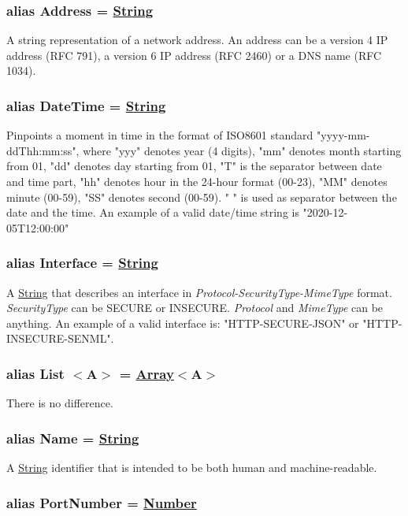 \documentclass[a4paper]{arrowhead}
\newcommand{\pdef}[1]{{\textcolor{ArrowheadGrey}{#1 \label{sec:model:primitives:#1} \label{sec:model:primitives:#1s}}}}
\newcommand{\pref}[1]{{\textcolor{ArrowheadGrey}{\hyperref[sec:model:primitives:#1]{#1}}}}
\begin{document}
\subsubsection{alias \pdef{Address} = \pref{String}}

A string representation of a network address. An address can be a version 4 IP address (RFC 791), a version 6 IP address (RFC 2460) or a DNS name (RFC 1034).

\subsubsection{alias \pdef{DateTime} = \pref{String}}

Pinpoints a moment in time in the format of ISO8601 standard "yyyy-mm-ddThh:mm:ss", where "yyy" denotes year (4 digits), "mm" denotes month starting from 01, "dd" denotes day starting from 01, "T" is the separator between date and time part, "hh" denotes hour in the 24-hour format (00-23), "MM" denotes minute (00-59), "SS" denotes second (00-59). " " is used as separator between the date and the time.
An example of a valid date/time string is "2020-12-05T12:00:00"

\subsubsection{alias \pdef{Interface} = \pref{String}}

A \pref{String} that describes an interface in \textit{Protocol-SecurityType-MimeType} format. \textit{SecurityType} can be SECURE or INSECURE. \textit{Protocol} and \textit{MimeType} can be anything. An example of a valid interface is: "HTTP-SECURE-JSON" or "HTTP-INSECURE-SENML".

\subsubsection{alias \pdef{List}$<$A$>$ = \pref{Array}$<$A$>$}
There is no difference.

\subsubsection{alias \pdef{Name} = \pref{String}}

A \pref{String} identifier that is intended to be both human and machine-readable.

\subsubsection{alias \pdef{PortNumber} = \pref{Number}}
\end{document}

